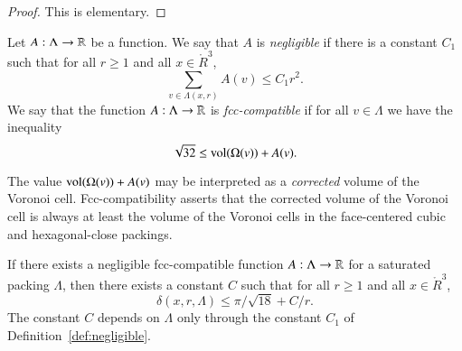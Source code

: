 \begin{proof}  This is elementary.
\end{proof}

\begin{definition}\label{def:negligible}
Let $A:\Lambda\to{\mathbb R}$ be a function.  We say that $A$
is
  {\it negligible\/}
if there is a constant $C_1$ such that for all $r\ge1$ and all
$x\in\ring{R}^3$,
   $$\sum_{v\in\Lambda(x,r)} A(v) \le C_1 r^2.$$
We say that the function $A:\Lambda\to{\mathbb R}$ is
  {\it fcc-compatible\/}
if for all $v\in\Lambda$ we have the inequality
$$\sqrt{32}\le {\operatorname{vol}}(\Omega(v)) + A(v).$$
\end{definition}



\begin{remark}
The value ${\operatorname{vol}}(\Omega(v)) + A(v)$ may be interpreted as a
{\it corrected\/} volume of the Voronoi
cell. Fcc-compatibility asserts that the corrected volume of the
Voronoi cell is always at least the volume of the Voronoi cells in
the face-centered cubic and hexagonal-close packings.
\end{remark}



\begin{lemma}
\label{lemma:deltabound} If there exists a 
negligible  fcc-compatible function
$A:\Lambda\to{\mathbb R}$ for a saturated packing $\Lambda$, then there
exists a constant $C$ such that for all $r\ge1$ and all
$x\in\ring{R}^3$,
    $$
    \delta(x,r,\Lambda)
    \le \pi/\sqrt{18} + C/r.
    $$
The constant $C$ depends on $\Lambda$ only through the constant
$C_1$ of Definition~\ref{def:negligible}.
\end{lemma}



